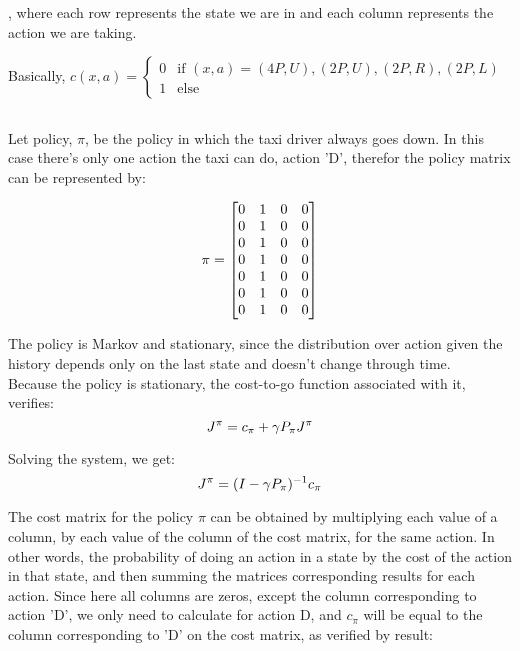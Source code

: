 \documentclass{article}
\begin{document}
\medskip

, where each row represents the state we are in and each column represents the action we are taking.

\medskip

Basically, $c(x, a) = \left\{\begin{array}{ll}
    0 & \text{if } (x, a) = (4P, U), (2P, U), (2P, R), (2P, L) \\
    1 & \text{else}
\end{array}
\right.$

\subsection{}

Let policy, $\pi$, be the policy in which the taxi driver always goes down. In this case there's only one action the taxi can do, action 'D',
therefor the policy matrix can be represented by: 

\begin{equation}
    \notag
    \pi = \begin{bmatrix}
        0 & 1 & 0 & 0 \\
        0 & 1 & 0 & 0 \\
        0 & 1 & 0 & 0 \\
        0 & 1 & 0 & 0 \\
        0 & 1 & 0 & 0 \\
        0 & 1 & 0 & 0 \\
        0 & 1 & 0 & 0 \\
    \end{bmatrix}
\end{equation}

The policy is Markov and stationary, since the distribution over action given the history depends only on the last state and
doesn't change through time. \\

Because the policy is stationary, the cost-to-go function associated with it, verifies:
\begin{equation}
    \notag
    J^\pi = c_\pi + {\gamma}P_{\pi}J^{\pi}
\end{equation}

Solving the system, we get:
\begin{equation}
    \notag
    J^\pi = {(I - {\gamma}P_{\pi})^{-1}}c_\pi
\end{equation}

\medskip

The cost matrix for the policy $\pi$ can be obtained by multiplying each value of a column, by each value of the column of the cost matrix, for the same action.
In other words, the probability of doing an action in a state by the cost of the action in that state, and then summing the matrices corresponding results for each action.
Since here all columns are zeros, except the column corresponding to action 'D', we only need to calculate for action D, and $c_{\pi}$ will be equal to the column corresponding to 'D' on the cost matrix, as verified by result:
\end{document}

